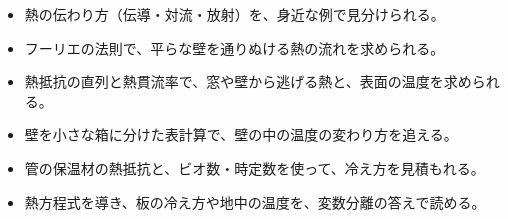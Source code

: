 
\begin{goal}
\begin{itemize}[label={\color{bkTheme}●}, leftmargin=1.6\zw, itemsep=0pt, topsep=1pt]
\item {}\enspace 熱の伝わり方（伝導・対流・放射）を、身近な例で見分けられる。
\item {}\enspace フーリエの法則で、平らな壁を通りぬける熱の流れを求められる。
\item {}\enspace 熱抵抗の直列と熱貫流率で、窓や壁から逃げる熱と、表面の温度を求められる。
\item {}\enspace 壁を小さな箱に分けた表計算で、壁の中の温度の変わり方を追える。
\item {}\enspace 管の保温材の熱抵抗と、ビオ数・時定数を使って、冷え方を見積もれる。
\item {}\enspace 熱方程式を導き、板の冷え方や地中の温度を、変数分離の答えで読める。
\end{itemize}
\end{goal}


